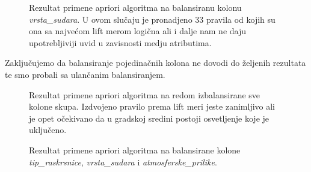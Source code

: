 \documentclass[a4paper,10pt]{article}
\begin{document}
\begin{figure}[h!]
 \centering
 \caption{Rezultat primene apriori algoritma na balansiranu kolonu \textit{vrsta\_sudara}. U ovom slučaju je pronadjeno 33 pravila
  od kojih su ona sa najvećom lift merom logična ali i dalje nam ne daju upotrebljiviji uvid u zavisnosti medju atributima. }
\end{figure}

\clearpage
Zaključujemo da balansiranje pojedinačnih kolona ne dovodi do željenih rezultata te smo probali sa ulančanim balansiranjem.

\begin{figure}[!h]
 \centering
 \caption{Rezultat primene apriori algoritma na redom izbalansirane sve kolone skupa. Izdvojeno pravilo prema lift meri jeste
 zanimljivo ali je opet očekivano da u gradskoj sredini postoji osvetljenje koje je uključeno. }
\end{figure}

\begin{figure}[!h]
 \centering
 \caption{Rezultat primene apriori algoritma na balansirane kolone \textit{tip\_raskrsnice}, \textit{vrsta\_sudara} 
 i \textit{atmosferske\_prilike}. }
\end{figure}
\end{document}
